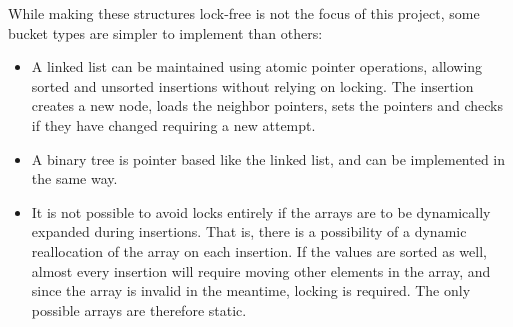 While making these structures lock-free is not the focus of this project, some
bucket types are simpler to implement than others:
\begin{itemize}
\item A linked list can be maintained using atomic pointer operations, allowing
sorted and unsorted insertions without relying on locking. The insertion creates
a new node, loads the neighbor pointers, sets the pointers and checks if they have
changed requiring a new attempt.
\item A binary tree is pointer based like the linked list, and can be
implemented in the same way.
%
\item It is not possible to avoid locks entirely if the arrays are to be
dynamically expanded during insertions. That is, there is a possibility of a
dynamic reallocation of the array on each insertion. If the values are sorted
as well, almost every insertion will require moving other elements in the
array, and since the array is invalid in the meantime, locking is
required. The only possible arrays are therefore static.
\end{itemize}
